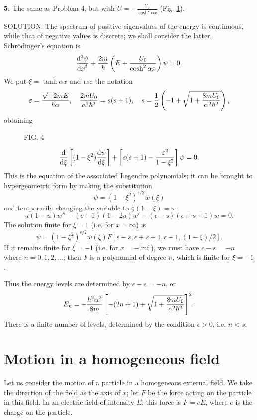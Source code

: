 {\textbf{5.} The same as Problem 4, but with $ U = -{\displaystyle \frac{U_0}{\cosh^2\alpha x}}$ (Fig. \ref{Fig.4}).
\vspace{1.2ex}





SOLUTION. The spectrum of positive eigenvalues of the energy is continuous, while that of negative values is discrete; we shall consider the latter. Schrödinger’s equation is
\[ \frac{\mathrm{d}^2\psi}{{\mathrm{d} x}^2}+\frac{2m}{\hbar}\left(E+\frac{U_0}{\cosh^2\alpha x} \right)\psi=0. \]
We put $ \xi= \tanh \alpha x $ and use the notation
\[ \varepsilon=\frac{\sqrt{-2mE}}{\hbar\alpha},\quad\frac{2mU_0}{\alpha^2\hbar^2}=s(s+1),\quad s=\frac{1}{2}\left( -1+\sqrt{1+\frac{8mU_0}{\alpha^2\hbar^2}}\right), \]
obtaining
\begin{wrapfigure}[]{r}[0cm]{0cm}
	\caption{FIG. 4}\label{Fig.4}
\end{wrapfigure}
\[ \frac{\mathrm{d}}{\mathrm{d}\xi}\left[(1-\xi^2)\frac{\mathrm{d}\psi}{\mathrm{d}\xi} \right]+\left[s(s+1)-\frac{\varepsilon^2}{1-\xi^2} \right]\psi=0. \]
This is the equation of the associated Legendre polynomials; it can be brought to hypergeometric form by making the substitution  
\[ \psi = (1 − \xi^2)^{\epsilon/2}w(\xi) \]  
and temporarily changing the variable to $ \frac{1}{2}(1 − ξ)=u $:
\[ u(1-u)w''+(\epsilon+1)(1-2u)w'-(\epsilon-s)(\epsilon+s+1)w=0. \]
The solution finite for $ \xi= 1 $ (i.e. for $ x = \infty $) is
\[ \psi=(1 − \xi^2)^{\epsilon/2}w(\xi)F[\epsilon-s,\epsilon+s+1,\epsilon-1,(1-\xi)/2]. \]
If $\psi$ remains finite for $ \xi= −1 $ (i.e. for $ x = -\inf $), we must have $\epsilon-s=-n$ where $ n = 0, 1, 2, \dots $; then $ F $ is a polynomial of degree $ n $, which is finite for $ \xi = −1 $. 

Thus the energy levels are determined by $\epsilon-s=-n$, or
\[ E_n=-\frac{\hbar^2\alpha^2}{8m}\left[ -(2n+1)+\sqrt{1+\frac{8mU_0}{\alpha^2\hbar^2}} \right]^2. \]
There is a finite number of levels, determined by the condition $ \epsilon>0 $, i.e. $ n < s $.}
\section{Motion in a homogeneous field}\label{Motion in a homogeneous field}
Let us consider the motion of a particle in a homogeneous external field. We take the direction of the field as the axis of $ x $; let $ F $ be the force acting on the particle in this field. In an electric field of intensity $ E $, this force is $ F = eE $, where $ e $ is the charge on the particle.

